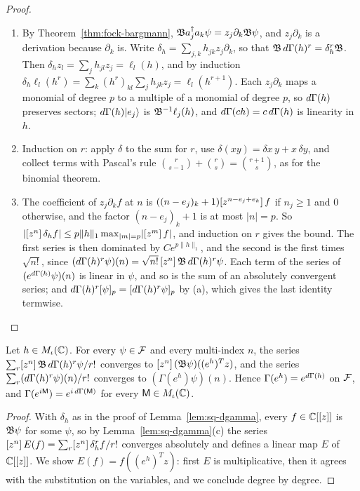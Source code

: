 \begin{vetdenv}
\begin{proof}
\begin{enumerate}
\item[(a)] By Theorem~\ref{thm:fock-bargmann}, $\mathfrak B a_j^\dagger a_k\psi=z_j\partial_k\mathfrak B\psi$, and $z_j\partial_k$
is a derivation because $\partial_k$ is. Write $\delta_h=\sum_{j,k}h_{jk}z_j\partial_k$, so that $\mathfrak B\,d\Gamma(h)^r=
\delta_h^r\mathfrak B$. Then $\delta_hz_l=\sum_jh_{jl}z_j=\ell_l(h)$, and by induction
$\delta_h\ell_l(h^r)=\sum_k(h^r)_{kl}\sum_jh_{jk}z_j=\ell_l(h^{r+1})$. Each $z_j\partial_k$ maps a monomial of
degree $p$ to a multiple of a monomial of degree $p$, so $d\Gamma(h)$ preserves sectors; $d\Gamma(h)\lvert e_j\rangle$ is
$\mathfrak B^{-1}\ell_j(h)$, and $d\Gamma(ch)=c\,d\Gamma(h)$ is linearity in $h$.
\item[(b)] Induction on $r$: apply $\delta$ to the sum for $r$, use $\delta(xy)=\delta x\,y+x\,\delta y$, and collect
terms with Pascal's rule $\binom r{s-1}+\binom rs=\binom{r+1}s$, as for the binomial theorem.
\item[(c)] The coefficient of $z_j\partial_kf$ at $n$ is $((n-e_j)_k+1)[z^{n-e_j+e_k}]\,f$ if $n_j\ge1$ and $0$
otherwise, and the factor $(n-e_j)_k+1$ is at most $\lvert n\rvert=p$. So $\lvert[z^{n}]\,\delta_hf\rvert\le
p\lVert h\rVert_1\max_{\lvert m\rvert=p}\lvert[z^{m}]\,f\rvert$, and induction on $r$ gives the bound. The first series is
then dominated by $Ce^{p\lVert h\rVert_1}$, and the second is the first times $\sqrt{n!}$, since
$(d\Gamma(h)^r\psi)(n)=\sqrt{n!}\,[z^{n}]\,\mathfrak B\,d\Gamma(h)^r\psi$. Each term of the series of $(e^{d\Gamma(h)}\psi)(n)$ is linear in
$\psi$, and so is the sum of an absolutely convergent series; and $d\Gamma(h)^r[\psi]_p=[d\Gamma(h)^r\psi]_p$ by (a), which
gives the last identity termwise.\qedhere
\end{enumerate}
\end{proof}

\begin{theorem}\label{thm:sq-exp}
Let $h\in M_\iota(\mathbb C)$. For every $\psi\in\mathcal F$ and every multi-index $n$, the series $\sum_r[z^{n}]\,\mathfrak B\,d\Gamma(h)^r
\psi/r!$ converges to $[z^{n}]\,(\mathfrak B\psi)((e^h)^Tz)$, and the series $\sum_r(d\Gamma(h)^r\psi)(n)/r!$ converges to
$(\Gamma(e^h)\psi)(n)$. Hence $\Gamma(e^h)=e^{d\Gamma(h)}$ on $\mathcal F$, and $\Gamma(e^{i\mathsf M})=e^{i\,d\Gamma(\mathsf M)}$ for
every $\mathsf M\in M_\iota(\mathbb C)$.
\end{theorem}

\begin{proof}
With $\delta_h$ as in the proof of Lemma~\ref{lem:sq-dgamma}, every $f\in\mathbb C[[z]]$ is $\mathfrak B\psi$ for some $\psi$,
so by Lemma~\ref{lem:sq-dgamma}(c) the series $[z^{n}]\,E(f)=\sum_r[z^{n}]\,\delta_h^rf/r!$ converges absolutely and
defines a linear map $E$ of $\mathbb C[[z]]$. We show $E(f)=f((e^h)^Tz)$: first $E$ is multiplicative, then it agrees
with the substitution on the variables, and we conclude degree by degree.


\end{proof}
\end{vetdenv}
